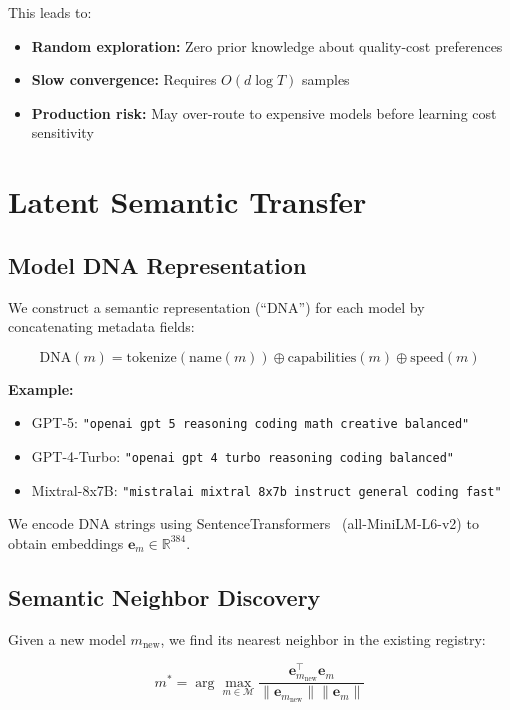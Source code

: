 \documentclass[sigconf,nonacm]{acmart}
\begin{document}
This leads to:
\begin{itemize}
    \item \textbf{Random exploration:} Zero prior knowledge about quality-cost preferences
    \item \textbf{Slow convergence:} Requires $O(d \log T)$ samples~\cite{abbasi2011improved}
    \item \textbf{Production risk:} May over-route to expensive models before learning cost sensitivity
\end{itemize}

\section{Latent Semantic Transfer}

\subsection{Model DNA Representation}

We construct a semantic representation (``DNA'') for each model by concatenating metadata fields:

\begin{equation}
\text{DNA}(m) = \text{tokenize}(\text{name}(m)) \oplus \text{capabilities}(m) \oplus \text{speed}(m)
\end{equation}

\textbf{Example:}
\begin{itemize}
    \item GPT-5: \texttt{"openai gpt 5 reasoning coding math creative balanced"}
    \item GPT-4-Turbo: \texttt{"openai gpt 4 turbo reasoning coding balanced"}
    \item Mixtral-8x7B: \texttt{"mistralai mixtral 8x7b instruct general coding fast"}
\end{itemize}

We encode DNA strings using SentenceTransformers~\cite{reimers2019sentence} (all-MiniLM-L6-v2) to obtain embeddings $\mathbf{e}_m \in \mathbb{R}^{384}$.

\subsection{Semantic Neighbor Discovery}

Given a new model $m_{\text{new}}$, we find its nearest neighbor in the existing registry:

\begin{equation}
m^* = \arg\max_{m \in \mathcal{M}} \frac{\mathbf{e}_{m_{\text{new}}}^\top \mathbf{e}_m}{\|\mathbf{e}_{m_{\text{new}}}\| \|\mathbf{e}_m\|}
\end{equation}
\end{document}

